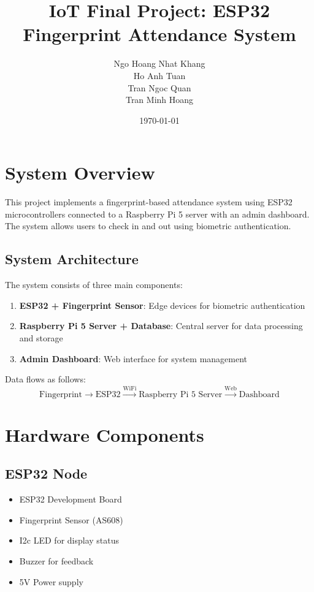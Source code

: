 \documentclass[10pt,a4paper]{article}
\title{IoT Final Project: ESP32 Fingerprint Attendance System}
\author{Ngo Hoang Nhat Khang \\ Ho Anh Tuan \\ Tran Ngoc Quan \\ Tran Minh Hoang}
\date{\today}
\begin{document}
\maketitle

\section{System Overview}

This project implements a fingerprint-based attendance system using ESP32 microcontrollers connected to a Raspberry Pi 5 server with an admin dashboard. The system allows users to check in and out using biometric authentication.

\subsection{System Architecture}

The system consists of three main components:

\begin{enumerate}
    \item \textbf{ESP32 + Fingerprint Sensor}: Edge devices for biometric authentication
    \item \textbf{Raspberry Pi 5 Server + Database}: Central server for data processing and storage
    \item \textbf{Admin Dashboard}: Web interface for system management
\end{enumerate}

Data flows as follows:
$$\text{Fingerprint} \rightarrow \text{ESP32} \xrightarrow{\text{WiFi}} \text{Raspberry Pi 5 Server} \xrightarrow{\text{Web}} \text{Dashboard}$$

\section{Hardware Components}

\subsection{ESP32 Node}
\begin{itemize}
    \item ESP32 Development Board
    \item Fingerprint Sensor (AS608)
    \item I2c LED for display status 
    \item Buzzer for feedback
    \item 5V Power supply
\end{itemize}
\end{document}
